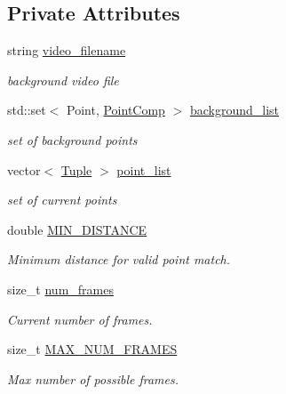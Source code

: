 \subsection*{\-Private \-Attributes}
\begin{DoxyCompactItemize}
\item 
string \hyperlink{class_point_tracker_a104961431d688ff50c5d3627be38a261}{video\-\_\-filename}
\begin{DoxyCompactList}\small\item\em background video file \end{DoxyCompactList}\item 
std\-::set$<$ \-Point, \hyperlink{struct_point_comp}{\-Point\-Comp} $>$ \hyperlink{class_point_tracker_a8004ae283ecebae76ba65cd13106651d}{background\-\_\-list}
\begin{DoxyCompactList}\small\item\em set of background points \end{DoxyCompactList}\item 
vector$<$ \hyperlink{class_tuple}{\-Tuple} $>$ \hyperlink{class_point_tracker_a3c396dbdf7e00c4cce3b371dd5cddd28}{point\-\_\-list}
\begin{DoxyCompactList}\small\item\em set of current points \end{DoxyCompactList}\item 
double \hyperlink{class_point_tracker_a3cbc1fe8d39f2c8183654a67f914fa37}{\-M\-I\-N\-\_\-\-D\-I\-S\-T\-A\-N\-C\-E}
\begin{DoxyCompactList}\small\item\em \-Minimum distance for valid point match. \end{DoxyCompactList}\item 
size\-\_\-t \hyperlink{class_point_tracker_aa32e4991c19d192737ae6d5db32a504a}{num\-\_\-frames}
\begin{DoxyCompactList}\small\item\em \-Current number of frames. \end{DoxyCompactList}\item 
size\-\_\-t \hyperlink{class_point_tracker_acb445ed3b433172cb10172db77ed702a}{\-M\-A\-X\-\_\-\-N\-U\-M\-\_\-\-F\-R\-A\-M\-E\-S}
\begin{DoxyCompactList}\small\item\em \-Max number of possible frames. \end{DoxyCompactList}\end{DoxyCompactItemize}


